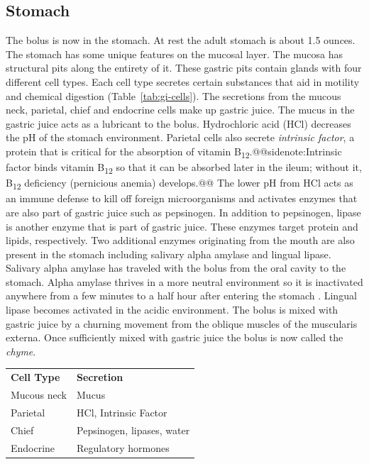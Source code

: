 \documentclass{tufte-handout}
\makeatletter
\def\sidenote#1{@@sidenote:#1@@}
\makeatother
\begin{document}
\subsection{Stomach}
The bolus is now in the stomach. At rest the adult stomach is about 1.5 ounces. The stomach has some unique features on the mucosal layer. The mucosa has structural pits along the entirety of it. These gastric pits contain glands with four different cell types. Each cell type secretes certain substances that aid in motility and chemical digestion (Table~\ref{tab:gi-cells}). The secretions from the mucous neck, parietal, chief and endocrine cells make up gastric juice. The mucus in the gastric juice acts as a lubricant to the bolus. Hydrochloric acid (HCl) decreases the pH of the stomach environment. Parietal cells also secrete \emph{intrinsic factor}, a protein that is critical for the absorption of vitamin B\textsubscript{12}.\sidenote{Intrinsic factor binds vitamin B\textsubscript{12} so that it can be absorbed later in the ileum; without it, B\textsubscript{12} deficiency (pernicious anemia) develops.} The lower pH from HCl acts as an immune defense to kill off foreign microorganisms and activates enzymes that are also part of gastric juice such as pepsinogen. In addition to pepsinogen, lipase is another enzyme that is part of gastric juice. These enzymes target protein and lipids, respectively. Two additional enzymes originating from the mouth are also present in the stomach including salivary alpha amylase and lingual lipase. Salivary alpha amylase has traveled with the bolus from the oral cavity to the stomach. Alpha amylase thrives in a more neutral environment so it is inactivated anywhere from a few minutes to a half hour after entering the stomach \citep{Rohleder2009}. Lingual lipase becomes activated in the acidic environment. The bolus is mixed with gastric juice by a churning movement from the oblique muscles of the muscularis externa. Once sufficiently mixed with gastric juice the bolus is now called the \emph{chyme}. 

\begin{margintable}
\caption{Gastric cell types and their secretions}\label{tab:gi-cells}
\begin{tabular}{ll}
\textbf{Cell Type} & \textbf{Secretion} \\
Mucous neck	 & Mucus                     \\
Parietal & HCl, Intrinsic Factor             \\
Chief & Pepsinogen, lipases, water \\
Endocrine & Regulatory hormones                    
\end{tabular}
\end{margintable}
\end{document}
